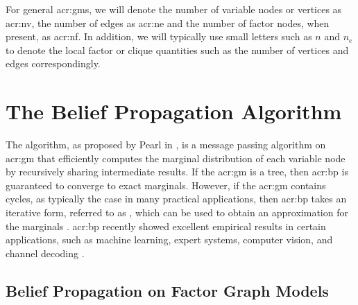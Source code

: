For general \glspl{acr:gm}, we will denote the number of variable nodes or vertices as \gls{acr:nv}, the number of edges as \gls{acr:ne} and the number of factor nodes, when present, as \gls{acr:nf}.
In addition, we will typically use small letters such as $n$ and $n_e$ to denote the local factor or clique quantities such as the number of vertices and edges correspondingly.



\section{The Belief Propagation Algorithm}
\label{sec:bp}


The  algorithm, as proposed by Pearl in \cite{bib:Pearl88ProbabilisticReasoning}, is a message passing algorithm on \gls{acr:gm} that efficiently computes the marginal distribution of each variable node by recursively sharing intermediate results.
If the \gls{acr:gm} is a tree, then \gls{acr:bp} is guaranteed to converge to exact marginals.
However, if the \gls{acr:gm} contains cycles, as typically the case in many practical applications, then \gls{acr:bp} takes an iterative form, referred to as , which can be used to obtain an approximation for the marginals \cite{bib:Pearl88ProbabilisticReasoning,bib:Yedidia2004CFEAAGBPA,bib:Weiss01CorrectnessBelief,bib:Wainwright03tbrfasp}.
\Gls{acr:bp} recently showed excellent empirical results in certain applications, such as machine learning, expert systems, computer vision, and channel decoding \cite{bib:Kschischang2001FGATSA, bib:Wainwright2008GMEFAVI,bib:Luby2001ILDPC,bib:Mceliece98turbodecoding,Richardson2001CLDPC,bib:cv1999,bibSun2003SMU,bib:Frey2001NIPS,bib:Kolmogorov2006ctr,bib:Weiss2005gobp,bib:Szeliski2008CS}.


\subsection{Belief Propagation on Factor Graph Models}


